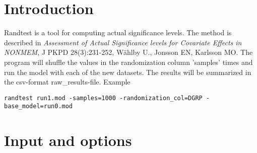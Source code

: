 



\maketitle


\section{Introduction}

Randtest is a tool for computing actual significance levels. The method is described in
\emph{Assessment of Actual Significance levels for Covariate Effects in NONMEM}, 
J PKPD 28(3):231-252, Wählby U., Jonsson EN, Karlsson MO. 
The program will shuffle the values in the randomization 
column 'samples' times and run the model with each of the new datasets. The results will be summarized in the csv-format raw\_results-file. 
Example
\begin{verbatim}
randtest run1.mod -samples=1000 -randomization_col=DGRP -base_model=run0.mod
\end{verbatim}

\section{Input and options}
